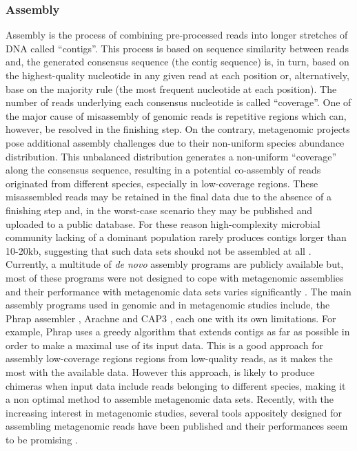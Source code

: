 \subsubsection{Assembly \label{par:assembly}}
Assembly is the process of combining pre-processed reads into longer stretches of DNA called ``contigs''. This process is based on sequence similarity between reads and, the generated consensus sequence (the contig sequence) is, in turn, based on the highest-quality nucleotide in any given read at each position or, alternatively, base on the majority rule (the most frequent nucleotide at each position). The number of reads underlying each consensus nucleotide is called ``coverage''. One of the major cause of misassembly of genomic reads is repetitive regions which can, however, be resolved in the finishing step. On the contrary, metagenomic projects pose additional assembly challenges due to their non-uniform species abundance distribution. This unbalanced distribution generates a non-uniform ``coverage'' along the consensus sequence, resulting in a potential co-assembly of reads originated from different species, especially in low-coverage regions. These misassembled reads may be retained in the final data due to the absence of a finishing step and, in the worst-case scenario they may be published and uploaded to a public database. For these reason high-complexity microbial community lacking of a dominant population rarely produces contigs lorger than 10-20kb, suggesting that such data sets shoukd not be assembled at all \cite{mavromatis2007use}.\\
Currently, a multitude of \textit{de novo} assembly programs are publicly available but, most of these programs were not designed to cope with metagenomic assemblies and their performance with metagenomic data sets varies significantly \cite{mavromatis2007use}. The main assembly programs used in genomic and in metagenomic studies include, the Phrap assembler \cite{bastide2007assembling}, Arachne \cite{batzoglou2002arachne} and CAP3 \cite{huang1999cap3}, each one with its own limitations. For example, Phrap uses a greedy algorithm that extends contigs as far as possible in order to make a maximal use of its input data. This is a good approach for assembly low-coverage regions regions from low-quality reads, as it makes the most with the available data. However this approach, is likely to produce chimeras when input data include reads belonging to different species, making it a non optimal method to assemble metagenomic data sets. Recently, with the increasing interest in metagenomic studies, several tools appositely designed for assembling metagenomic reads have been published \cite{namiki2012metavelvet, peng2011meta} and their performances seem to be promising \cite{segata2013computational}.\\

